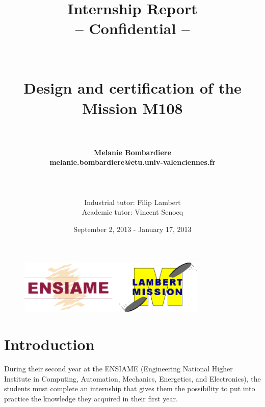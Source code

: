 \documentclass[11pt,a4paper]{article}
\begin{document}
\title{~\\
~\\
\textbf{Internship Report}\\
-- Confidential --\\
~\\
~\\
Design and certification of the Mission M108\\
~\\}

\author{
  \textbf{Melanie Bombardiere}\\
  \textbf{melanie.bombardiere@etu.univ-valenciennes.fr}\\
  \\
  \\
  \\
  Industrial tutor: Filip Lambert\\
  Academic tutor: Vincent Senocq
}
\date{September 2, 2013 - January 17, 2013}

\begin{figure}[position]
  \centering
  \includegraphics[width=0.8\textwidth]{pics/logo.png}
\end{figure}

\maketitle

\newpage

\pagestyle{fancy}
\fancyhead{}

\tableofcontents

\newpage

\section{Introduction}

During their second year at the ENSIAME (Engineering National Higher Institute in Computing, Automation, Mechanics, Energetics, and Electronics), the students must complete an internship that gives them the possibility to put into practice the knowledge they acquired in their first year.
\end{document}
